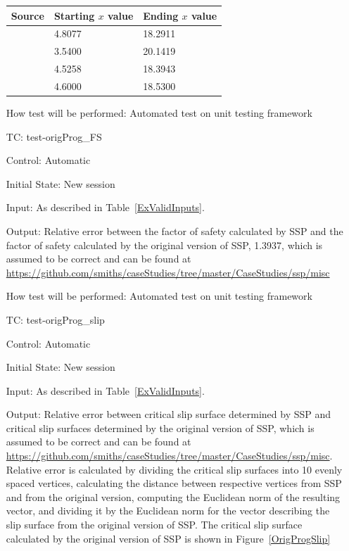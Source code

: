 \documentclass[12pt, titlepage]{article}
\newcounter{testnum} %
\newcommand{\progname}{SSP}
\begin{document}
\begin{enumerate}[label=TC\arabic*:,ref={\arabic*}]

\begin{tabularx}{1.0\textwidth}{l p{3.5cm} p{3.5cm}}
	\toprule \textbf{Source} & \textbf{Starting $x$ value} & 
	\textbf{Ending $x$ value}\\ \midrule
	\cite{Greco1996} & 4.8077 & 18.2911\\
	\cite{MalkawiEtAl} & 3.5400 & 20.1419\\
	\cite{ChengEtAl} & 4.5258 & 18.3943\\
	\cite{LiEtAl} & 4.6000 & 18.5300\\
	\bottomrule
\end{tabularx}

How test will be performed: Automated test on unit testing framework

\item [TC\refstepcounter{testnum}\thetestnum: \label{TC_OrigProgFS}] 
test-origProg\_FS

Control: Automatic

Initial State: New session

Input: As described in Table~\ref{ExValidInputs}.

Output: Relative error between the factor of safety calculated by \progname{} 
and the factor of safety calculated by the original version of \progname{}, 
1.3937, which is assumed to be correct and can be found at \newline
\href{https://github.com/smiths/caseStudies/tree/master/CaseStudies/ssp/misc}
{https://github.com/smiths/caseStudies/tree/master/CaseStudies/ssp/misc}

How test will be performed: Automated test on unit testing framework

\item [TC\refstepcounter{testnum}\thetestnum: \label{TC_OrigProgSlip}] 
test-origProg\_slip

Control: Automatic

Initial State: New session

Input: As described in Table~\ref{ExValidInputs}.

Output: Relative error between critical slip surface determined by \progname{} 
and critical slip surfaces determined by the original version of 
\progname{}, which is assumed to be correct and can be found at \newline
\href{https://github.com/smiths/caseStudies/tree/master/CaseStudies/ssp/misc}
{https://github.com/smiths/caseStudies/tree/master/CaseStudies/ssp/misc}. 
Relative error is calculated by dividing the critical slip surfaces into 10 
evenly spaced vertices, calculating the distance between respective vertices 
from \progname{} and from the original version, computing the Euclidean norm of 
the resulting vector, and dividing it by the Euclidean norm for the vector 
describing the slip surface from the original version of \progname{}. The 
critical slip surface calculated by the original version of SSP is shown in 
Figure~\ref{OrigProgSlip}


\end{enumerate}
\end{document}
